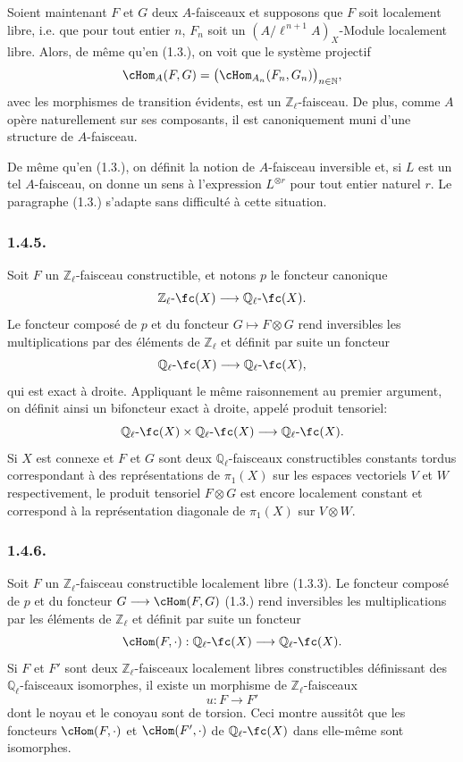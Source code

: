 Soient maintenant \(F\) et \(G\) deux \(A\)-faisceaux et supposons que \(F\) soit localement libre, i.e. que pour tout entier \(n\), \(F_n\) soit un \((A/\ell^{\,n+1}A)_X\)-Module localement libre. Alors, de même qu'en (1.3.), on
voit que le système projectif
\[
\cHom_A(F,G)=\bigl(\cHom_{A_n}(F_n,G_n)\bigr)_{n\in\mathbb{N}},
\]
avec les morphismes de transition évidents, est un \(\mathbb{Z}_\ell\)-faisceau. De plus, comme \(A\) opère naturellement sur ses composants, il est canoniquement muni d'une structure de \(A\)-faisceau.

De même qu'en (1.3.), on définit la notion de \(A\)-faisceau inversible et, si \(L\) est un tel \(A\)-faisceau, on donne un sens à l'expression \(L^{\otimes r}\) pour tout entier naturel \(r\). Le paragraphe (1.3.) s'adapte sans difficulté à cette situation.

\subsubsection*{1.4.5.}
Soit \(F\) un \(\mathbb{Z}_\ell\)-faisceau constructible, et notons \(p\) le foncteur canonique
\[
\mathbb{Z}_\ell\text{-}\fc(X)\longrightarrow \mathbb{Q}_\ell\text{-}\fc(X).
\]
Le foncteur composé de \(p\) et du foncteur \(G\mapsto F\otimes G\) rend inversibles les multiplications par des éléments de \(\mathbb{Z}_\ell\) et définit par suite un foncteur
\[
\mathbb{Q}_\ell\text{-}\fc(X)\longrightarrow \mathbb{Q}_\ell\text{-}\fc(X),
\]
qui est exact à droite. Appliquant le même raisonnement au premier argument, on définit ainsi un bifoncteur exact à droite, appelé produit tensoriel:
\[
\mathbb{Q}_\ell\text{-}\fc(X)\times \mathbb{Q}_\ell\text{-}\fc(X)
\longrightarrow \mathbb{Q}_\ell\text{-}\fc(X).
\]
Si \(X\) est connexe et \(F\) et \(G\) sont deux \(\mathbb{Q}_\ell\)-faisceaux constructibles constants tordus correspondant à des représentations de \(\pi_1(X)\) sur les espaces vectoriels \(V\) et \(W\) respectivement, le produit tensoriel \(F\otimes G\) est encore localement constant et correspond à la représentation diagonale de \(\pi_1(X)\) sur \(V\otimes W\).

\subsubsection*{1.4.6.}
Soit \(F\) un \(\mathbb{Z}_\ell\)-faisceau constructible localement libre (1.3.3). Le foncteur composé de \(p\) et du foncteur \(G\longrightarrow\cHom(F,G)\) (1.3.) rend inversibles les multiplications par les éléments de \(\mathbb{Z}_\ell\) et définit par suite un foncteur
\[
\cHom(F,\cdot):\mathbb{Q}_\ell\text{-}\fc(X)\longrightarrow \mathbb{Q}_\ell\text{-}\fc(X).
\]
Si \(F\) et \(F'\) sont deux \(\mathbb{Z}_\ell\)-faisceaux localement libres constructibles définissant des \(\mathbb{Q}_\ell\)-faisceaux isomorphes, il existe un morphisme de \(\mathbb{Z}_\ell\)-faisceaux
\[
u:F\longrightarrow F'
\]
dont le noyau et le conoyau sont de torsion. Ceci montre aussitôt que les foncteurs \(\cHom(F,\cdot)\) et \(\cHom(F',\cdot)\) de \(\mathbb{Q}_\ell\text{-}\fc(X)\) dans elle-même sont isomorphes.

